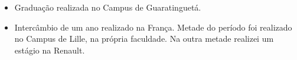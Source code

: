 
    \medskip
    
    \begin{itemize}
         \item Graduação realizada no Campus de Guaratinguetá. 
      \end{itemize}

    \medskip

    \begin{itemize}
         \item Intercâmbio de um ano realizado na França. Metade do período foi realizado no Campus de Lille, na própria faculdade. Na outra metade realizei um estágio na Renault.
    \end{itemize}